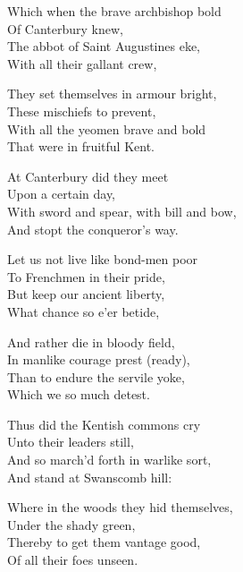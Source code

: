 \begin{dcverse}\footnotesizerr
\begin{altverse}
Which when the brave archbishop bold\\
Of Canterbury knew,\\
The abbot of Saint Augustines eke,\\
With all their gallant crew,
\end{altverse}

\begin{altverse}
They set themselves in armour bright,\\
These mischiefs to prevent,\\
With all the yeomen brave and bold\\
That were in fruitful Kent.
\end{altverse}

\begin{altverse}
At Canterbury did they meet\\
Upon a certain day,\\
With sword and spear, with bill and bow,\\
And stopt the conqueror’s way.
\end{altverse}

\begin{altverse}
Let us not live like bond-men poor\\
To Frenchmen in their pride,\\
But keep our ancient liberty,\\
What chance so e’er betide,
\end{altverse}

\begin{altverse}
And rather die in bloody field,\\
In manlike courage prest (ready),\\
Than to endure the servile yoke,\\
Which we so much detest.
\end{altverse}

\begin{altverse}
Thus did the Kentish commons cry\\
Unto their leaders still,\\
And so march’d forth in warlike sort,\\
And stand at Swanscomb hill:
\end{altverse}

\begin{altverse}
Where in the woods they hid themselves,\\
Under the shady green,\\
Thereby to get them vantage good,\\
Of all their foes unseen.
\end{altverse}


\end{dcverse}

